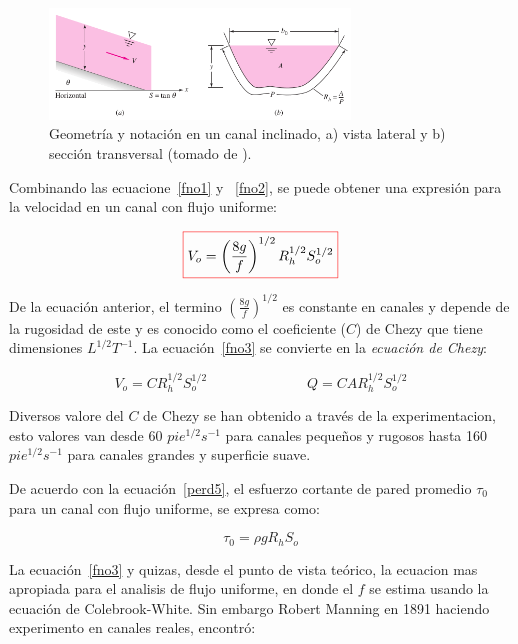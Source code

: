 \documentclass[11pt, oneside]{article}
\begin{document}
\begin{figure}[h]
\centering
\includegraphics[width=8cm]{fnor2.png}
\caption{Geometr\'ia y notaci\'on en un canal inclinado, a) vista lateral y b) secci\'on transversal (tomado de \cite{white1990fluid}).}
\label{fnor2}
\end{figure}

Combinando las ecuacione~\ref{fno1} y ~\ref{fno2}, se puede obtener una expresi\'on para la velocidad en un canal con flujo uniforme:

\begin{equation}
\color{red}\boxed{\color{black} V_o = \left( \frac{8g}{f} \right)^{1/2} R_h^{1/2} S_o^{1/2} }
\label{fno3}
\end{equation}

De la ecuaci\'on anterior, el termino $\left( \frac{8g}{f} \right)^{1/2}$ es constante en canales y depende de la rugosidad de este y es conocido como el coeficiente ($C$) de Chezy que tiene dimensiones $L^{1/2} T^{-1}$. La ecuaci\'on~\ref{fno3} se convierte en la \emph{ecuaci\'on de Chezy}:

\begin{equation}
V_o = C R_h^{1/2} S_o^{1/2} \hspace{3cm} Q = CAR_h^{1/2} S_o^{1/2}
\label{fno4}
\end{equation}

Diversos valore del $C$ de Chezy se han obtenido a trav\'es de la experimentacion, esto valores van desde 60 $pie^{1/2} s^{-1}$ para canales peque\~nos y rugosos hasta 160 $pie^{1/2} s^{-1}$ para canales grandes y superficie suave.

De acuerdo con la ecuaci\'on~\ref{perd5}, el esfuerzo cortante de pared promedio $\tau_0$ para un canal con flujo uniforme, se expresa como:

\begin{equation}
\tau_0 = \rho g R_h S_o
\label{fno5}
\end{equation}

La ecuaci\'on~\ref{fno3} y quizas, desde el punto de vista te\'orico, la ecuacion mas apropiada para el analisis de flujo uniforme, en donde el $f$ se estima usando la ecuaci\'on de Colebrook-White. Sin embargo Robert Manning en 1891 haciendo experimento en canales reales, encontr\'o:
\end{document}
